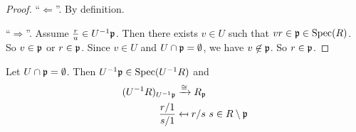 \begin{proof}
    ``$\Leftarrow$''. By definition. \par 
    ``$\Rightarrow$''. Assume $\frac{r}{u} \in U^{-1}\mathfrak{p}$. Then there exists $v \in U$ such that $vr \in \mathfrak{p} \in \operatorname{Spec}(R)$. So $v \in \mathfrak{p}$ or $r \in \mathfrak{p}$. Since $v \in U$ and $U \cap \mathfrak{p} = \emptyset$, we have $v \not \in \mathfrak{p}$. So $r \in \mathfrak{p}$.
\end{proof}

\begin{proposition}
    Let $U \cap \mathfrak{p} = \emptyset$. Then $U^{-1}\mathfrak{p} \in \operatorname{Spec}(U^{-1}R)$ and 
    \begin{align*}
        (U^{-1}R)_{U^{-1}\mathfrak{p}} &\xrightarrow \cong R_{\mathfrak{p}} \\
        \frac{r/1}{s/1} &\mapsfrom r/s \ s \in R \setminus \mathfrak{p} 
    \end{align*}
\end{proposition}

